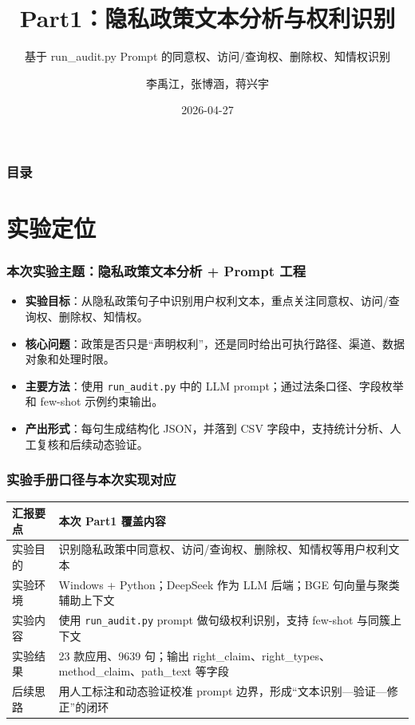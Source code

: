 \documentclass[AutoFakeBold,AutoFakeSlant]{beamer}
\author{李禹江，张博涵，蒋兴宇}
\title{Part1：隐私政策文本分析与权利识别}
\subtitle{基于 run\_audit.py Prompt 的同意权、访问/查询权、删除权、知情权识别}
\institute{我的刀盾队}
\date{2026-04-27}
\begin{document}
\kaishu

\begin{frame}
    \titlepage
\end{frame}

\begin{frame}
    \frametitle{目录}
    \tableofcontents
\end{frame}

\section{实验定位}

\begin{frame}
    \frametitle{本次实验主题：隐私政策文本分析 + Prompt 工程}
    \small
    \begin{itemize}
        \item \textbf{实验目标}：从隐私政策句子中识别用户权利文本，重点关注同意权、访问/查询权、删除权、知情权。
        \item \textbf{核心问题}：政策是否只是“声明权利”，还是同时给出可执行路径、渠道、数据对象和处理时限。
        \item \textbf{主要方法}：使用 \texttt{run\_audit.py} 中的 LLM prompt；通过法条口径、字段枚举和 few-shot 示例约束输出。
        \item \textbf{产出形式}：每句生成结构化 JSON，并落到 CSV 字段中，支持统计分析、人工复核和后续动态验证。
    \end{itemize}
\end{frame}

\begin{frame}
    \frametitle{实验手册口径与本次实现对应}
    \small
    \begin{tabularx}{\textwidth}{|p{}|X|}
        \toprule
        \textbf{汇报要点} & \textbf{本次 Part1 覆盖内容} \\
        \midrule
        实验目的 & 识别隐私政策中同意权、访问/查询权、删除权、知情权等用户权利文本 \\
        \midrule
        实验环境 & Windows + Python；DeepSeek 作为 LLM 后端；BGE 句向量与聚类辅助上下文 \\
        \midrule
        实验内容 & 使用 \texttt{run\_audit.py} prompt 做句级权利识别，支持 few-shot 与同簇上下文 \\
        \midrule
        实验结果 & 23 款应用、9639 句；输出 right\_claim、right\_types、method\_claim、path\_text 等字段 \\
        \midrule
        后续思路 & 用人工标注和动态验证校准 prompt 边界，形成“文本识别—验证—修正”的闭环 \\
        \bottomrule
    \end{tabularx}
\end{frame}
\end{document}
